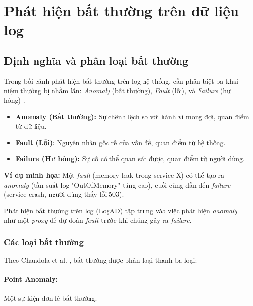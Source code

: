 
\section{Phát hiện bất thường trên dữ liệu log}
\label{sec:anomaly-detection}

\subsection{Định nghĩa và phân loại bất thường}
\label{subsec:anomaly-definition}

Trong bối cảnh phát hiện bất thường trên log hệ thống, cần phân biệt ba khái niệm thường bị nhầm lẫn: \textit{Anomaly} (bất thường), \textit{Fault} (lỗi), và \textit{Failure} (hư hỏng) \cite{chandola2009anomaly}.

\begin{itemize}
    \item \textbf{Anomaly (Bất thường):} Sự chênh lệch so với hành vi mong đợi, quan điểm từ dữ liệu.
    \item \textbf{Fault (Lỗi):} Nguyên nhân gốc rễ của vấn đề, quan điểm từ hệ thống.
    \item \textbf{Failure (Hư hỏng):} Sự cố có thể quan sát được, quan điểm từ người dùng.
\end{itemize}

\textbf{Ví dụ minh họa:} Một \textit{fault} (memory leak trong service X) có thể tạo ra \textit{anomaly} (tần suất log "OutOfMemory" tăng cao), cuối cùng dẫn đến \textit{failure} (service crash, người dùng thấy lỗi 503).

Phát hiện bất thường trên log (LogAD) tập trung vào việc phát hiện \textit{anomaly} như một \textit{proxy} để dự đoán \textit{fault} trước khi chúng gây ra \textit{failure}.

\subsubsection{Các loại bất thường}

Theo Chandola et al. \cite{chandola2009anomaly}, bất thường được phân loại thành ba loại:

\paragraph{Point Anomaly:} Một sự kiện đơn lẻ bất thường.

